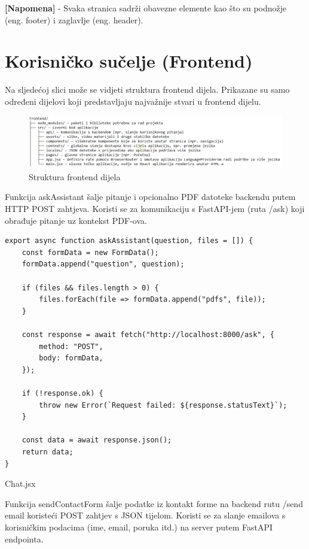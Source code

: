 \documentclass[]{foi}
\begin{document}
\textbf{[Napomena]} - Svaka stranica sadrži obavezne elemente kao što su podnožje (eng. footer) i zaglavlje (eng. header).

\section{Korisničko sučelje (Frontend)}
Na sljedećoj slici može se vidjeti struktura frontend dijela. Prikazane su samo određeni dijelovi koji predstavljaju najvažnije
stvari u frontend dijelu.
\begin{figure}[ht!]
    \centering
    \includegraphics[width=1\textwidth]{./assets/frontendstructure.png} 
    \caption{Struktura frontend dijela}
    \label{fig:slika18}
\end{figure}

Funkcija askAssistant šalje pitanje i opcionalno PDF datoteke backendu putem HTTP POST zahtjeva. Koristi se za komunikaciju s FastAPI-jem
(ruta /ask) koji obrađuje pitanje uz kontekst PDF-ova.

\begin{longlisting}
\begin{verbatim}
export async function askAssistant(question, files = []) {
    const formData = new FormData();
    formData.append("question", question);

    if (files && files.length > 0) {
        files.forEach(file => formData.append("pdfs", file));
    }

    const response = await fetch("http://localhost:8000/ask", {
        method: "POST",
        body: formData,
    });

    if (!response.ok) {
        throw new Error(`Request failed: ${response.statusText}`);
    }

    const data = await response.json();
    return data;
}
\end{verbatim}
\caption{Chat.jsx}
\label{lst:chat}
\end{longlisting}

Funkcija sendContactForm šalje podatke iz kontakt forme na backend rutu /send email koristeći POST zahtjev s JSON tijelom.
Koristi se za slanje emailova s korisničkim podacima (ime, email, poruka itd.) na server putem FastAPI endpointa.
\end{document}
